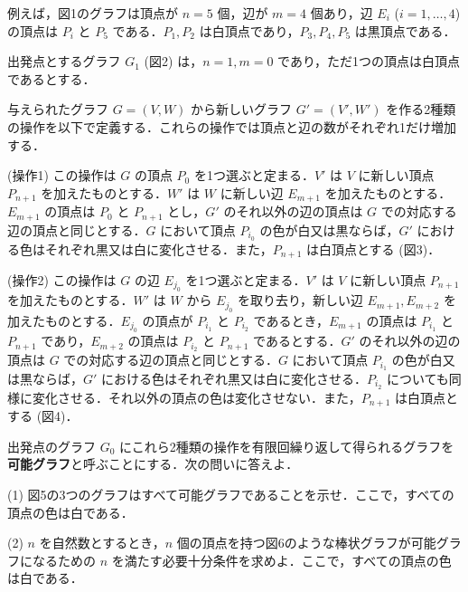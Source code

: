 \documentclass[unicode,12pt, A4j]{ltjsarticle}%
\begin{document}
例えば，図1のグラフは頂点が $n=5$ 個，辺が $m=4$ 個あり，辺 $E_i$ ($i=1, \dots, 4$) の頂点は $P_i$ と $P_5$ である．$P_1, P_2$ は白頂点であり，$P_3, P_4, P_5$ は黒頂点である．

出発点とするグラフ $G_1$ (図2) は，$n=1, m=0$ であり，ただ1つの頂点は白頂点であるとする．

与えられたグラフ $G = (V, W)$ から新しいグラフ $G' = (V', W')$ を作る2種類の操作を以下で定義する．これらの操作では頂点と辺の数がそれぞれ1だけ増加する．

(操作1) この操作は $G$ の頂点 $P_0$ を1つ選ぶと定まる．$V'$ は $V$ に新しい頂点 $P_{n+1}$ を加えたものとする．$W'$ は $W$ に新しい辺 $E_{m+1}$ を加えたものとする．$E_{m+1}$ の頂点は $P_0$ と $P_{n+1}$ とし，$G'$ のそれ以外の辺の頂点は $G$ での対応する辺の頂点と同じとする．$G$ において頂点 $P_{i_0}$ の色が白又は黒ならば，$G'$ における色はそれぞれ黒又は白に変化させる．また，$P_{n+1}$ は白頂点とする (図3)．

(操作2) この操作は $G$ の辺 $E_{j_0}$ を1つ選ぶと定まる．$V'$ は $V$ に新しい頂点 $P_{n+1}$ を加えたものとする．$W'$ は $W$ から $E_{j_0}$ を取り去り，新しい辺 $E_{m+1}, E_{m+2}$ を加えたものとする．$E_{j_0}$ の頂点が $P_{i_1}$ と $P_{i_2}$ であるとき，$E_{m+1}$ の頂点は $P_{i_1}$ と $P_{n+1}$ であり，$E_{m+2}$ の頂点は $P_{i_2}$ と $P_{n+1}$ であるとする．$G'$ のそれ以外の辺の頂点は $G$ での対応する辺の頂点と同じとする．$G$ において頂点 $P_{i_1}$ の色が白又は黒ならば，$G'$ における色はそれぞれ黒又は白に変化させる．$P_{i_2}$ についても同様に変化させる．それ以外の頂点の色は変化させない．また，$P_{n+1}$ は白頂点とする (図4)．

出発点のグラフ $G_0$ にこれら2種類の操作を有限回繰り返して得られるグラフを\textbf{可能グラフ}と呼ぶことにする．次の問いに答えよ．

(1) 図5の3つのグラフはすべて可能グラフであることを示せ．ここで，すべての頂点の色は白である．

(2) $n$ を自然数とするとき，$n$ 個の頂点を持つ図6のような棒状グラフが可能グラフになるための $n$ を満たす必要十分条件を求めよ．ここで，すべての頂点の色は白である．
\end{document}
